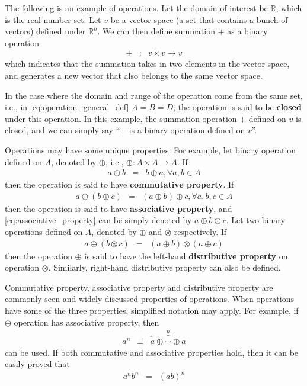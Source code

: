 The following is an example of operations. Let the domain of interest be $\mathbb{R}$, which is the real number set. Let $v$ be a vector space (a set that contains a bunch of vectors) defined under $\mathbb{R}^n$. We can then define summation $+$ as a binary operation
\begin{eqnarray}
	+ &:& v\times v \rightarrow v \nonumber
\end{eqnarray} 
which indicates that the summation takes in two elements in the vector space, and generates a new vector that also belongs to the same vector space. 

In the case where the domain and range of the operation come from the same set, i.e., in \eqref{eq:operation_general_def} $A=B=D$, the operation is said to be \textbf{closed} under this operation. In this example, the summation operation $+$ defined on $v$ is closed, and we can simply say ``$+$ is a binary operation defined on $v$''.

Operations may have some unique properties. For example, let binary operation defined on $A$, denoted by $\oplus $, i.e., $\oplus: A\times A \rightarrow A$. If
\begin{eqnarray}
	a \oplus b &=& b \oplus a, \forall a, b \in A \nonumber
\end{eqnarray}
then the operation is said to have \textbf{commutative property}. If
\begin{eqnarray}
	a \oplus (b \oplus c) &=& (a \oplus b) \oplus c, \forall a,b,c \in A \label{eq:associative_property}
\end{eqnarray}
then the operation is said to have \textbf{associative property}, and \eqref{eq:associative_property} can be simply denoted by $a \oplus b \oplus c$. Let two binary operations defined on $A$, denoted by $\oplus$ and $\otimes$ respectively. If
\begin{eqnarray}
	a \oplus (b \otimes c) &=& (a \oplus b) \otimes (a \oplus c) \nonumber
\end{eqnarray}
then the operation $\oplus$ is said to have the left-hand \textbf{distributive property} on operation $\otimes$. Similarly, right-hand distributive property can also be defined.  

Commutative property, associative property and distributive property are commonly seen and widely discussed properties of operations. When operations have some of the three properties, simplified notation may apply. For example, if $\oplus$ operation has associative property, then
\begin{eqnarray}
	a^n &\equiv& \overbrace{a \oplus \cdots \oplus a}^{n} \nonumber
\end{eqnarray}
can be used. If both commutative and associative properties hold, then it can be easily proved that
\begin{eqnarray}
	a^nb^n & = & (ab)^n \nonumber 
\end{eqnarray}

